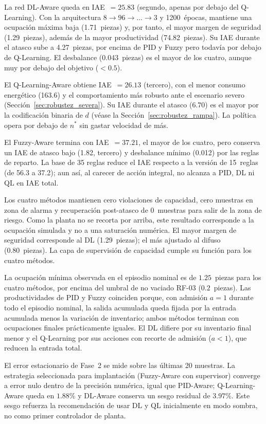 La red DL-Aware queda en IAE~$=25.83$ (segundo, apenas por debajo del Q-Learning). Con la arquitectura $8\!\to\!96\!\to\!\dots\!\to\!3$ y 1200~épocas, mantiene una ocupación máxima baja (1.71~piezas) y, por tanto, el mayor margen de seguridad (1.29~piezas), además de la mayor productividad (74.82~piezas). Su IAE durante el atasco sube a 4.27~piezas, por encima de PID y Fuzzy pero todavía por debajo de Q-Learning. El desbalance (0.043~piezas) es el mayor de los cuatro, aunque muy por debajo del objetivo ($<0.5$).

El Q-Learning-Aware obtiene IAE~$=26.13$ (tercero), con el menor consumo energético (163.6) y el comportamiento más robusto ante el escenario severo (Sección~\ref{sec:robustez_severa}). Su IAE durante el atasco (6.70) es el mayor por la codificación binaria de $d$ (véase la Sección~\ref{sec:robustez_rampa}). La política opera por debajo de $n^*$ sin gastar velocidad de más.

El Fuzzy-Aware termina con IAE~$=37.21$, el mayor de los cuatro, pero conserva un IAE de atasco bajo (1.82, tercero) y desbalance mínimo (0.012) por las reglas de reparto. La base de 35 reglas reduce el IAE respecto a la versión de 15~reglas (de 56.3 a 37.2); aun así, al carecer de acción integral, no alcanza a PID, DL ni QL en IAE total.

Los cuatro métodos mantienen cero violaciones de capacidad, cero muestras en zona de alarma y recuperación post-atasco de 0~muestras para salir de la zona de riesgo. Como la planta no se recorta por arriba, este resultado corresponde a la ocupación simulada y no a una saturación numérica. El mayor margen de seguridad corresponde al DL (1.29~piezas); el más ajustado al difuso (0.80~piezas). La capa de supervisión de capacidad cumple su función para los cuatro métodos.

La ocupación mínima observada en el episodio nominal es de $1.25$~piezas para los cuatro métodos, por encima del umbral de no vaciado RF-03 ($0.2$~piezas). Las productividades de PID y Fuzzy coinciden porque, con admisión $a=1$ durante todo el episodio nominal, la salida acumulada queda fijada por la entrada acumulada menos la variación de inventario; ambos métodos terminan con ocupaciones finales prácticamente iguales. El DL difiere por su inventario final menor y el Q-Learning por sus acciones con recorte de admisión ($a<1$), que reducen la entrada total.

El error estacionario de Fase~2 se mide sobre las últimas 20 muestras. La estrategia seleccionada para implantación (Fuzzy-Aware con supervisor) converge a error nulo dentro de la precisión numérica, igual que PID-Aware; Q-Learning-Aware queda en $1.88\%$ y DL-Aware conserva un sesgo residual de $3.97\%$. Este sesgo refuerza la recomendación de usar DL y QL inicialmente en modo sombra, no como primer controlador de planta.

